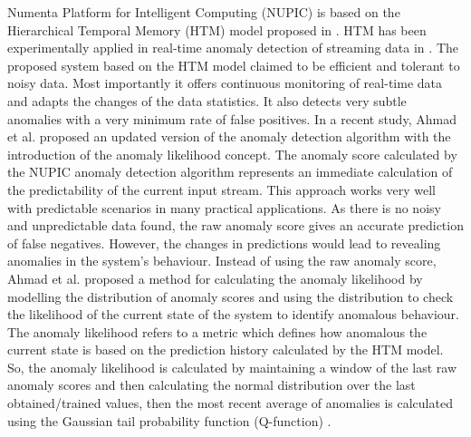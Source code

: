 \documentclass[sigconf]{acmart}
\begin{document}
Numenta Platform for Intelligent Computing (NUPIC) is based on the Hierarchical Temporal Memory (HTM) model proposed in \cite{Hawkins:2007fi}. HTM has been experimentally applied in real-time anomaly detection of streaming data in \cite{DBLP:journals/corr/AhmadP16,DBLP:journals/corr/LavinA15}. The proposed system based on the HTM model claimed to be efficient and tolerant to noisy data. Most importantly it offers continuous monitoring of real-time data and adapts the changes of the data statistics. It also detects very subtle anomalies with a very minimum rate of false positives. In a recent study, Ahmad et al. \cite{AHMAD2017134} proposed an updated version of the anomaly detection algorithm with the introduction of the anomaly likelihood concept. 
The anomaly score calculated by the NUPIC anomaly detection algorithm represents an immediate calculation of the predictability of the current input stream. This approach works very well with predictable scenarios in many practical applications. As there is no noisy and unpredictable data found, the raw anomaly score gives an accurate prediction of false negatives. However, the changes in predictions would lead to revealing anomalies in the system’s behaviour. Instead of using the raw anomaly score, Ahmad et al. \cite{AHMAD2017134} proposed a method for calculating the anomaly likelihood by modelling the distribution of anomaly scores and using the distribution to check the likelihood of the current state of the system to identify anomalous behaviour. The anomaly likelihood refers to a metric which defines how anomalous the current state is based on the prediction history calculated by the HTM model. So, the anomaly likelihood is calculated by maintaining a window of the last raw anomaly scores and then calculating the normal distribution over the last obtained/trained values, then the most recent average of anomalies is calculated using the Gaussian tail probability function (Q-function) \cite{craig1991new}.
\end{document}
